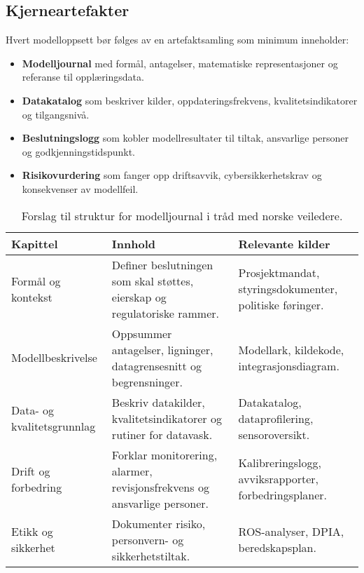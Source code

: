 \subsection{Kjerneartefakter}
Hvert modelloppsett bør følges av en artefaktsamling som minimum inneholder:
\begin{itemize}
    \item \textbf{Modelljournal} med formål, antagelser, matematiske representasjoner og referanse til opplæringsdata.
    \item \textbf{Datakatalog} som beskriver kilder, oppdateringsfrekvens, kvalitetsindikatorer og tilgangsnivå.
    \item \textbf{Beslutningslogg} som kobler modellresultater til tiltak, ansvarlige personer og godkjenningstidspunkt.
    \item \textbf{Risikovurdering} som fanger opp driftsavvik, cybersikkerhetskrav og konsekvenser av modellfeil.
\end{itemize}

\begin{table}[ht]
    \centering
    \caption{Forslag til struktur for modelljournal i tråd med norske veiledere.}
    \label{tab:kap02-modelljournal}
    \begin{tabular}{p{}p{}p{}}
        \toprule
        \textbf{Kapittel} & \textbf{Innhold} & \textbf{Relevante kilder} \\
        \midrule
        Formål og kontekst & Definer beslutningen som skal støttes, eierskap og regulatoriske rammer. & Prosjektmandat, styringsdokumenter, politiske føringer. \\
        Modellbeskrivelse & Oppsummer antagelser, ligninger, datagrensesnitt og begrensninger. & Modellark, kildekode, integrasjonsdiagram. \\
        Data- og kvalitetsgrunnlag & Beskriv datakilder, kvalitetsindikatorer og rutiner for datavask. & Datakatalog, dataprofilering, sensoroversikt. \\
        Drift og forbedring & Forklar monitorering, alarmer, revisjonsfrekvens og ansvarlige personer. & Kalibreringslogg, avviksrapporter, forbedringsplaner. \\
        Etikk og sikkerhet & Dokumenter risiko, personvern- og sikkerhetstiltak. & ROS-analyser, DPIA, beredskapsplan. \\
        \bottomrule
    \end{tabular}
\end{table}

